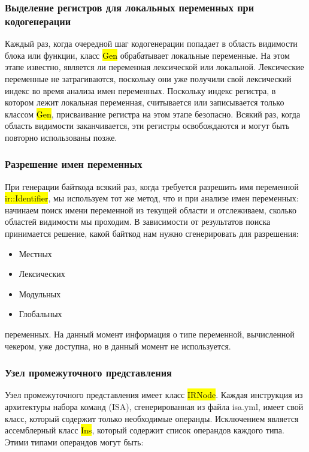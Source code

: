 \subsubsection{Выделение регистров для локальных переменных при кодогенерации}

Каждый раз, когда очередной шаг кодогенерации попадает в область видимости блока или функции, класс \hl{Gen}
обрабатывает локальные переменные.
На этом этапе известно, является ли переменная лексической или локальной.
Лексические переменные не затрагиваются, поскольку они уже получили свой лексический индекс во время
анализа имен переменных.
Поскольку индекс регистра, в котором лежит локальная переменная, считывается или записывается только классом \hl{Gen},
присваивание регистра на этом этапе безопасно.
Всякий раз, когда область видимости заканчивается, эти регистры освобождаются и могут быть повторно
использованы позже.

\subsubsection{Разрешение имен переменных}

При генерации байткода всякий раз, когда требуется разрешить имя переменной \hl{ir::Identifier},
мы используем тот же метод, что и при анализе имен переменных:
начинаем поиск имени переменной из текущей области и отслеживаем, сколько областей видимости мы проходим.
В зависимости от результатов поиска принимается решение, какой байткод нам нужно сгенерировать для разрешения:

\begin{itemize}[left=2em]
    \item Местных
    \item Лексических
    \item Модульных
    \item Глобальных
\end{itemize}

переменных.
На данный момент информация о типе переменной, вычисленной чекером, уже доступна, но в данный момент
не используется.

\subsubsection{Узел промежуточного представления}

Узел промежуточного представления имеет класс \hl{IRNode}.
Каждая инструкция из архитектуры набора команд (ISA), сгенерированная из файла isa.yml, имеет свой класс,
который содержит только необходимые операнды.
Исключением является ассемблерный класс \hl{Ins}, который содержит список операндов каждого типа.
Этими типами операндов могут быть:

